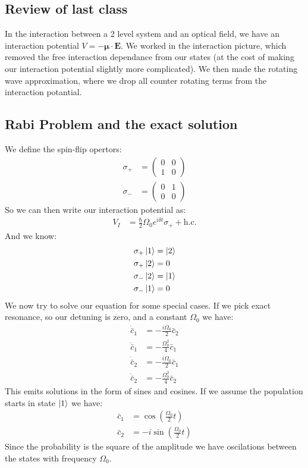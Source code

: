 \subsection{Review of last class}
In the interaction between a 2 level system and an optical field, we have an interaction potential $V= -\bm{\mu}\cdot\bm{E}$. We worked in the interaction picture, which removed the free interaction dependance from our states (at the cost of making our interaction potential slightly more complicated). We then made the rotating wave approximation, where we drop all counter rotating terms from the interaction potantial.
\subsection{Rabi Problem and the exact solution}
We define the spin-flip opertors:
\begin{align*}
	\sigma_+ &= \begin{pmatrix}
		0 & 0 \\
		1 & 0
	     \end{pmatrix} \\
	\sigma_- &= \begin{pmatrix}
		0 & 1 \\
		0 & 0
	     \end{pmatrix}
\end{align*}
So we can then write our interaction potential as:
\begin{align*}
	V_I &= \frac{\hbar}{2} \Omega_0 e^{i\delta t} \sigma_+ + \text{h.c.}
\end{align*}
And we know:
\begin{align*}
	\sigma_+ \ket{1} &= \ket{2} \\
	\sigma_+ \ket{2} &= 0 \\
	\sigma_- \ket{2} &= \ket{1} \\
	\sigma_- \ket{1} &= 0
\end{align*}
We now try to solve our equation for some special cases. If we pick exact resonance, so our detuning is zero, and a constant $\Omega_0$ we have:
\begin{align*}
	\dot{\bar{c}}_1 &= -\frac{i\Omega_0}{2} \bar{c}_2 \\
	\ddot{\bar{c}}_1 &= -\frac{\Omega_0^2}{4} \bar{c}_1 \\
	\dot{\bar{c}}_2 &= -\frac{i\Omega_0}{2} \bar{c}_1 \\
	\ddot{\bar{c}}_2 &= -\frac{\Omega_0^2}{4} \bar{c}_2
\end{align*}
This emits solutions in the form of sines and cosines. If we assume the population starts in state $\ket{1}$ we have:
\begin{align*}
	\bar{c}_1 &= \cos\left(\frac{\Omega_0}{2} t\right) \\
	\bar{c}_2 &= -i\sin\left(\frac{\Omega_0}{2} t\right)
\end{align*}
Since the probability is the square of the amplitude we have oscilations between the states with frequency $\Omega_0$.

